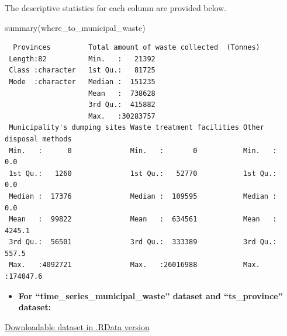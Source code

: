 \documentclass[
  11pt,
  a4paper,
  DIV=11,
  numbers=noendperiod]{scrartcl}
\newenvironment{Shaded}{\begin{snugshade}}{\end{snugshade}}
\newcommand{\FunctionTok}[1]{\textcolor[rgb]{0.28,0.35,0.67}{#1}}
\newcommand{\NormalTok}[1]{\textcolor[rgb]{0.00,0.23,0.31}{#1}}
\providecommand{\tightlist}{%
  \setlength{\itemsep}{0pt}\setlength{\parskip}{0pt}}\usepackage{longtable,booktabs,array}
\begin{document}
The descriptive statistics for each column are provided below.

\begin{Shaded}
\begin{Highlighting}[]
\FunctionTok{summary}\NormalTok{(where\_to\_municipal\_waste)}
\end{Highlighting}
\end{Shaded}

\begin{verbatim}
  Provinces         Total amount of waste collected  (Tonnes)
 Length:82          Min.   :   21392                         
 Class :character   1st Qu.:   81725                         
 Mode  :character   Median :  151235                         
                    Mean   :  738628                         
                    3rd Qu.:  415882                         
                    Max.   :30283757                         
 Municipality's dumping sites Waste treatment facilities Other disposal methods
 Min.   :      0              Min.   :       0           Min.   :     0.0      
 1st Qu.:   1260              1st Qu.:   52770           1st Qu.:     0.0      
 Median :  17376              Median :  109595           Median :     0.0      
 Mean   :  99822              Mean   :  634561           Mean   :  4245.1      
 3rd Qu.:  56501              3rd Qu.:  333389           3rd Qu.:   557.5      
 Max.   :4092721              Max.   :26016988           Max.   :174047.6      
\end{verbatim}

\begin{itemize}
\tightlist
\item
  \textbf{For ``time\_series\_municipal\_waste'' dataset and
  ``ts\_province'' dataset:}
\end{itemize}

\href{https://github.com/emu-hacettepe-analytics/emu660-spring2024-Dilara-pro/tree/main/project/data}{Downloadable
dataset in .RData version}
\end{document}
